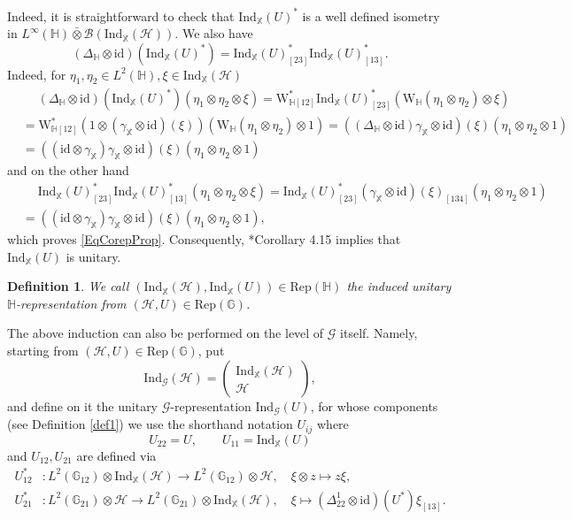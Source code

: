 \documentclass[reqno]{amsart}
\numberwithin{equation}{section}
\newtheorem{Def}[Theorem]{Definition}
\newcommand{\mcB}{\mathcal{B}}
\newcommand{\id}{\mathrm{id}}
\newcommand{\Hsp}{\mathcal{H}}
\newcommand{\G}{\mathbb{G}}
\newcommand{\Hh}{\mathbb{H}}
\newcommand{\X}{\mathbb{X}}
\newcommand{\msG}{\mathscr{G}}
\newcommand{\Rep}{\mathrm{Rep}}
\newcommand{\Ind}{\mathrm{Ind}}
\newcommand{\mc}{\mathcal}
\newcommand{\HH}{\mathbb{H}}
\newcommand{\ww}{\mathrm{W}}
\begin{document}
Indeed, it is straightforward to check that $\Ind_{\X}(U)^*$ is a well defined isometry in $L^{\infty}(\Hh)\bar\otimes \mcB(\Ind_{\X}(\mathcal{H}))$. We also have 
\begin{equation}\label{EqCorepProp}
(\Delta_{\Hh}\otimes\id)(\Ind_{\X}(U)^*)=\Ind_{\X}(U)^*_{[23]}\Ind_{\X}(U)^*_{[13]}.
\end{equation}
Indeed, for $\eta_1,\eta_2\in L^2(\Hh), \xi\in \Ind_{\X}(\mc{H})$
\[\begin{split}
&\quad\;
(\Delta_{\HH}\otimes\id)(\Ind_{\X}(U)^*)(\eta_1\otimes\eta_2\otimes \xi)=
\ww^{*}_{\HH  [12]} 
\Ind_{\X}(U)^*_{[23]}
( \ww_{\HH}(\eta_1\otimes\eta_2)\otimes\xi)\\
&=
\ww^{*}_{\HH [12]} 
(1\otimes (\gamma_{\X}\otimes\id)(\xi))
( \ww_{\HH}(\eta_1\otimes\eta_2)\otimes 1)=
((\Delta_{\HH}\otimes\id)\gamma_{\X}\otimes\id)(\xi)
(\eta_1\otimes\eta_2\otimes 1)\\
&=
((\id\otimes\gamma_{\X})\gamma_{\X}\otimes\id)(\xi)
(\eta_1\otimes\eta_2\otimes 1)
\end{split}\]
and on the other hand
\[\begin{split}
&\quad\;
\Ind_{\X}(U)^*_{[23]} \Ind_{\X}(U)^*_{[13]}
(\eta_1\otimes\eta_2\otimes\xi)=
\Ind_{\X}(U)^*_{[23]} 
(\gamma_{\X}\otimes\id)(\xi)_{[134]}
(\eta_1\otimes\eta_2\otimes 1)\\
&=
( (\id\otimes\gamma_{\X})\gamma_{\X}\otimes \id)(\xi)
(\eta_1\otimes\eta_2\otimes 1),
\end{split}\]
which proves \eqref{EqCorepProp}. Consequently, \cite{BDS13}*{Corollary 4.15} implies that $\Ind_{\X}(U)$ is unitary.
\begin{Def}
We call $(\Ind_{\X}(\Hsp),\Ind_{\X}(U))\in\Rep(\Hh)$ the \emph{induced unitary $\Hh$-representation} from $(\Hsp,U)\in \Rep(\G)$.
\end{Def}


The above induction can also be performed on the level of $\msG$ itself. Namely, starting from $(\Hsp,U) \in \Rep(\G)$, put 
\[
\Ind_{\msG}(\Hsp) = \begin{pmatrix} \Ind_{\X}(\Hsp) \\ \Hsp\end{pmatrix},
\] 
and define on it the unitary $\msG$-representation $\Ind_{\msG}(U)$, for whose components (see Definition \ref{def1}) we use the shorthand notation $U_{ij}$ where  
\begin{equation}
U_{22} = U,\qquad U_{11} = \Ind_{\X}(U)
\end{equation}
 and $U_{12},U_{21}$ are defined via 
\begin{equation}\begin{split}\label{eq44}
U_{12}^*&\colon L^2(\G_{12})\otimes \Ind_{\X}(\Hsp) \rightarrow L^2(\G_{12})\otimes \Hsp,\quad \xi\otimes z \mapsto  z \xi, \\
U_{21}^*&\colon L^2(\G_{21}) \otimes \Hsp \rightarrow L^2(\G_{21})\otimes \Ind_{\X}(\Hsp),\quad \xi \mapsto (\Delta_{22}^1\otimes \id)(U^*)\xi_{[13]}.
\end{split}\end{equation}
\end{document}

